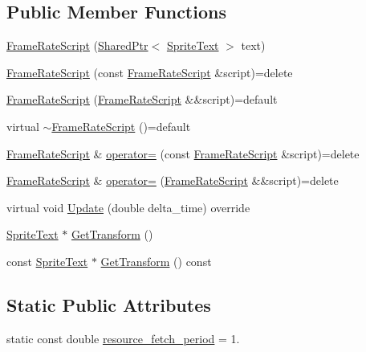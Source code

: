 \subsection*{Public Member Functions}
\begin{DoxyCompactItemize}
\item 
\hyperlink{classmage_1_1_frame_rate_script_a8ef13ffd08a684cbc2010b0e4594d4cf}{Frame\+Rate\+Script} (\hyperlink{namespacemage_a1e01ae66713838a7a67d30e44c67703e}{Shared\+Ptr}$<$ \hyperlink{classmage_1_1_sprite_text}{Sprite\+Text} $>$ text)
\item 
\hyperlink{classmage_1_1_frame_rate_script_a2c76a1ce175c5c5370582d7ccb878132}{Frame\+Rate\+Script} (const \hyperlink{classmage_1_1_frame_rate_script}{Frame\+Rate\+Script} \&script)=delete
\item 
\hyperlink{classmage_1_1_frame_rate_script_ae33867928ee55a1b9babc5fbdd2daef9}{Frame\+Rate\+Script} (\hyperlink{classmage_1_1_frame_rate_script}{Frame\+Rate\+Script} \&\&script)=default
\item 
virtual \hyperlink{classmage_1_1_frame_rate_script_af91b69dbb1b583e8e9cca24e7aa72f5d}{$\sim$\+Frame\+Rate\+Script} ()=default
\item 
\hyperlink{classmage_1_1_frame_rate_script}{Frame\+Rate\+Script} \& \hyperlink{classmage_1_1_frame_rate_script_a2077ec2facadcde117a20d18e2f0e9b7}{operator=} (const \hyperlink{classmage_1_1_frame_rate_script}{Frame\+Rate\+Script} \&script)=delete
\item 
\hyperlink{classmage_1_1_frame_rate_script}{Frame\+Rate\+Script} \& \hyperlink{classmage_1_1_frame_rate_script_a828664f89350ac0da2da3da26c05a6f0}{operator=} (\hyperlink{classmage_1_1_frame_rate_script}{Frame\+Rate\+Script} \&\&script)=delete
\item 
virtual void \hyperlink{classmage_1_1_frame_rate_script_a9bab0b26279823f1387428268b30e034}{Update} (double delta\+\_\+time) override
\item 
\hyperlink{classmage_1_1_sprite_text}{Sprite\+Text} $\ast$ \hyperlink{classmage_1_1_frame_rate_script_a23f833cb5a8b78fb38a47ac0db2305a8}{Get\+Transform} ()
\item 
const \hyperlink{classmage_1_1_sprite_text}{Sprite\+Text} $\ast$ \hyperlink{classmage_1_1_frame_rate_script_ab257acb42811f46fcb2aa90781dcdc28}{Get\+Transform} () const
\end{DoxyCompactItemize}
\subsection*{Static Public Attributes}
\begin{DoxyCompactItemize}
\item 
static const double \hyperlink{classmage_1_1_frame_rate_script_a34e734aedfe92891d87e5419ff60f4f2}{resource\+\_\+fetch\+\_\+period} = 1.
\end{DoxyCompactItemize}
